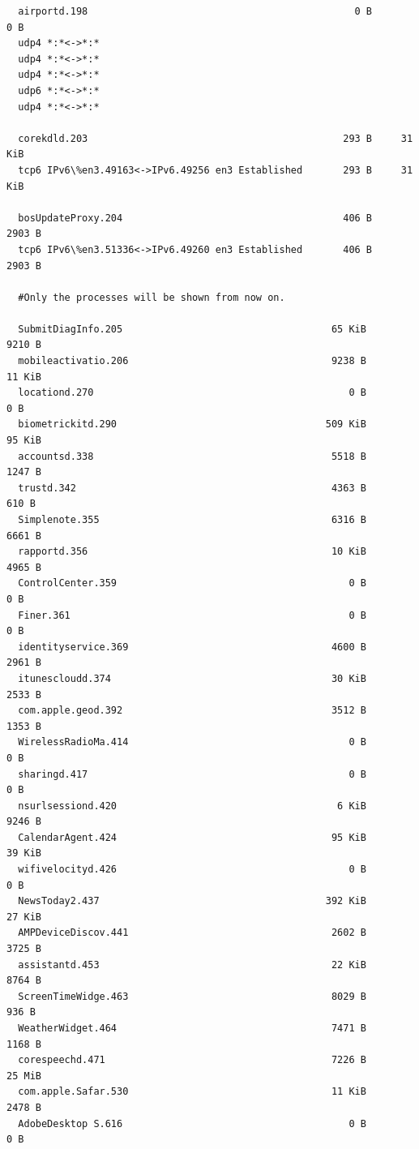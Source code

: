 \documentclass{article}
\begin{document}
\begin{lstlisting}
  airportd.198                                              0 B        0 B
  udp4 *:*<->*:*
  udp4 *:*<->*:*
  udp4 *:*<->*:*
  udp6 *:*<->*:*
  udp4 *:*<->*:*

  corekdld.203                                            293 B     31 KiB
  tcp6 IPv6\%en3.49163<->IPv6.49256 en3 Established       293 B     31 KiB

  bosUpdateProxy.204                                      406 B     2903 B
  tcp6 IPv6\%en3.51336<->IPv6.49260 en3 Established       406 B     2903 B

  #Only the processes will be shown from now on. 

  SubmitDiagInfo.205                                    65 KiB        9210 B
  mobileactivatio.206                                   9238 B        11 KiB
  locationd.270                                            0 B           0 B
  biometrickitd.290                                    509 KiB        95 KiB
  accountsd.338                                         5518 B        1247 B
  trustd.342                                            4363 B         610 B
  Simplenote.355                                        6316 B        6661 B
  rapportd.356                                          10 KiB        4965 B
  ControlCenter.359                                        0 B           0 B
  Finer.361                                                0 B           0 B
  identityservice.369                                   4600 B        2961 B
  itunescloudd.374                                      30 KiB        2533 B
  com.apple.geod.392                                    3512 B        1353 B
  WirelessRadioMa.414                                      0 B           0 B
  sharingd.417                                             0 B           0 B
  nsurlsessiond.420                                      6 KiB        9246 B
  CalendarAgent.424                                     95 KiB        39 KiB
  wifivelocityd.426                                        0 B           0 B
  NewsToday2.437                                       392 KiB        27 KiB
  AMPDeviceDiscov.441                                   2602 B        3725 B
  assistantd.453                                        22 KiB        8764 B
  ScreenTimeWidge.463                                   8029 B         936 B
  WeatherWidget.464                                     7471 B        1168 B
  corespeechd.471                                       7226 B        25 MiB
  com.apple.Safar.530                                   11 KiB        2478 B
  AdobeDesktop S.616                                       0 B           0 B

\end{lstlisting}
\end{document}
